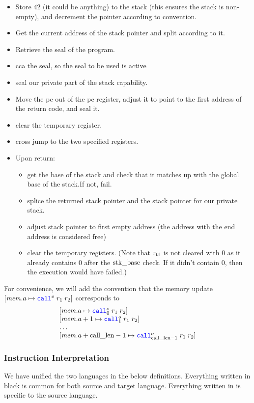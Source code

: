 \documentclass[a4paper]{article}
\begin{document}
\begin{itemize}
\item Store 42 (it could be anything) to the stack (this ensures the stack is non-empty), and decrement the pointer according to convention.
\item Get the current address of the stack pointer and split according to it.
\item Retrieve the seal of the program.
\item cca the seal, so the seal to be used is active 
\item seal our private part of the stack capability.
\item Move the pc out of the pc register, adjust it to point to the first address of the return code, and seal it.
\item clear the temporary register.
\item cross jump to the two specified registers.
\item Upon return:
  \begin{itemize}
  \item get the base of the stack and check that it matches up with the global base of the stack.If not, fail.
  \item splice the returned stack pointer and the stack pointer for our private stack.
  \item adjust stack pointer to first empty address (the address with the end address is considered free)  
  \item clear the temporary registers. (Note that $\mathrm{r}_\mathrm{t1}$ is not cleared with 0 as it already contains 0 after the $\mathrm{stk\_base}$ check. If it didn't contain 0, then the execution would have failed.)

  \end{itemize}
\end{itemize}

For convenience, we will add the convention that the memory update $\update{\mem.a}{\scall{o}{r_1}{r_2}}$ corresponds to
\[
  \begin{array}{l}
    \update{\mem.a}{\scall[0]{o}{r_1}{r_2}}\\
    \update{\mem.a+1}{\scall[1]{o}{r_1}{r_2}}\\
    \dots\\
    \update{\mem.a+\calllen-1}{\scall[\calllen-1]{o}{r_1}{r_2}}\\
  \end{array}
\]

\subsubsection{Instruction Interpretation}
We have unified the two languages in the below definitions. Everything written in black is common for both source and target language. Everything written in  is specific to the source language.
\end{document}
